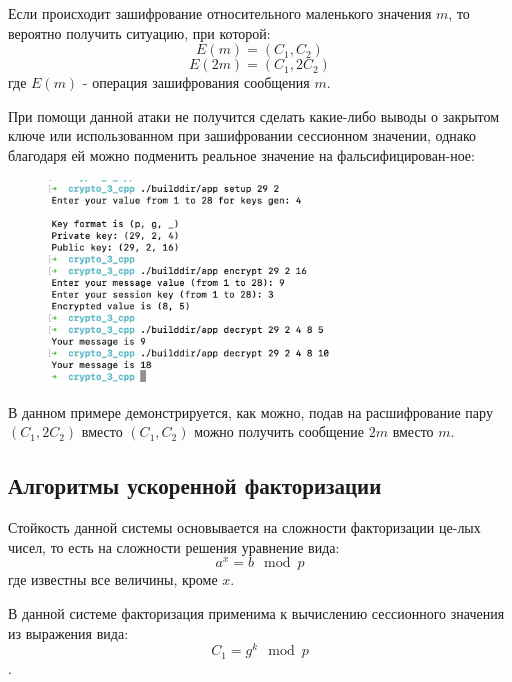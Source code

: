 \documentclass[a4paper]{article}
\begin{document}
  Если происходит зашифрование относительного маленького значения $m$, то вероятно получить ситуацию,
  при которой:
  \begin{equation}
    E(m) = (C_1, C_2)
  \end{equation}
  \begin{equation}
    E(2m) = (C_1, 2C_2)
  \end{equation}
  где $E(m)$ - операция зашифрования сообщения $m$.

  При помощи данной атаки не получится сделать какие-либо выводы о закрытом ключе
  или использованном при зашифровании сессионном значении, однако благодаря ей можно
  подменить реальное значение на фальсифицирован-ное:

  \begin{figure}[H]
    \centering
    \includegraphics[width=0.7\textwidth]{15_3}
  \end{figure}

  В данном примере демонстрируется, как можно, подав на расшифрование
  пару $(C_1, 2C_2)$ вместо $(C_1, C_2)$ можно получить сообщение $2m$ вместо $m$.

  \subsection{Алгоритмы ускоренной факторизации}

  Стойкость данной системы основывается на сложности факторизации це-лых чисел, то есть
  на сложности решения уравнение вида:
  \begin{equation}
    a^x = b \mod{p}
  \end{equation}
  где известны все величины, кроме $x$.

  В данной системе факторизация применима к вычислению сессионного значения из выражения вида:
  \begin{equation}
    C_1 = g^k\mod{p}
  \end{equation}.
\end{document}
